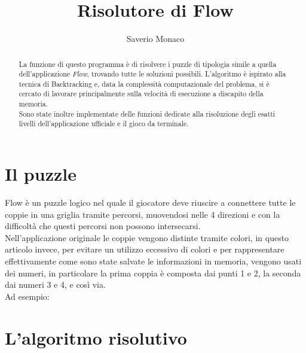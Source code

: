 \documentclass[11pt,a4paper,twocolumn]{IEEEtran}
\author{Saverio Monaco\\ \sepline}
\title{\textbf{Risolutore di Flow}}
\newcommand{\mysvg}[2]{}
\newcounter{algoritmo}
\begin{document}
	\maketitle
	\begin{abstract}
		La funzione di questo programma è di risolvere i puzzle di tipologia simile a quella dell'applicazione \textit{Flow}, trovando tutte le soluzioni possibili. L'algoritmo è ispirato alla tecnica di Backtracking e, data la complessità computazionale del problema, si è cercato di lavorare principalmente sulla velocità di esecuzione a discapito della memoria.\\ Sono state inoltre implementate delle funzioni dedicate alla risoluzione degli esatti livelli dell'applicazione ufficiale e il gioco da terminale.
	\end{abstract}
	\vspace{-.5cm}
	\section{Il puzzle}
	Flow è un puzzle logico nel quale il giocatore deve riuscire a connettere tutte le coppie in una griglia tramite percorsi, muovendosi nelle 4 direzioni e con la difficoltà che questi percorsi non possono intersecarsi.\\
	Nell'applicazione originale le coppie vengono distinte tramite colori, in questo articolo invece, per evitare un utilizzo eccessivo di colori e per rappresentare effettivamente come sono state salvate le informazioni in memoria, vengono usati dei numeri, in particolare la prima coppia è composta dai punti 1 e 2, la seconda dai numeri 3 e 4, e così via.\\
	Ad esempio:
	
	\begin{figure}[h]
		\hspace*{0.2cm}
		\mysvg{Numberlink_puzzle}{4}
		\mysvg{Rightarrow}{06}
		\mysvg{Numberlink_puzzle_solution}{4}
	\end{figure}
	
	\section{L'algoritmo risolutivo}
\end{document}
